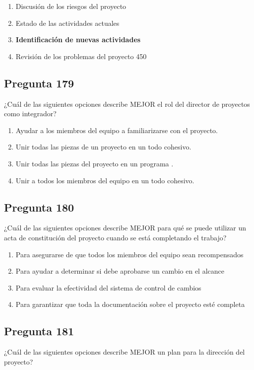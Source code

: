 \documentclass[11pt,a4paper]{article}
\begin{document}
\begin{enumerate}[label=\alph*)]
  \item Discusión de los riesgos del proyecto
  \item Estado de las actividades actuales
  \item \textbf{Identificación de nuevas actividades}
  \item Revisión de los problemas del proyecto 450
\end{enumerate}

\subsection*{Pregunta 179}
¿Cuál de las siguientes opciones describe MEJOR el rol del director de proyectos como integrador?

\begin{enumerate}[label=\alph*)]
  \item Ayudar a los miembros del equipo a familiarizarse con el proyecto.
  \item Unir todas las piezas de un proyecto en un todo cohesivo.
  \item Unir todas las piezas del proyecto en un programa .
  \item Unir a todos los miembros del equipo en un todo cohesivo.
\end{enumerate}

\subsection*{Pregunta 180}
¿Cuál de las siguientes opciones describe MEJOR para qué se puede utilizar un acta de constitución del proyecto cuando se está completando el trabajo?

\begin{enumerate}[label=\alph*)]
  \item Para asegurarse de que todos los miembros del equipo sean recompensados
  \item Para ayudar a determinar si debe aprobarse un cambio en el alcance
  \item Para evaluar la efectividad del sistema de control de cambios
  \item Para garantizar que toda la documentación sobre el proyecto esté completa
\end{enumerate}

\subsection*{Pregunta 181}
¿Cuál de las siguientes opciones describe MEJOR un plan para la dirección del proyecto?
\end{document}
